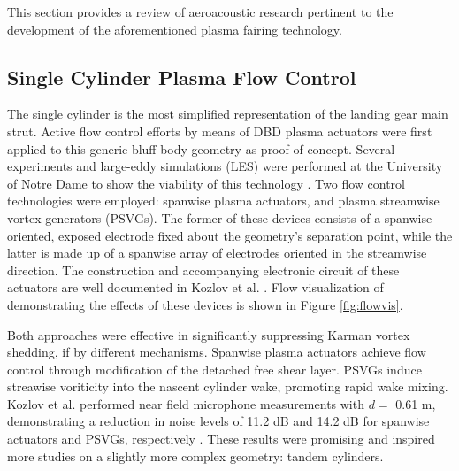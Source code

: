 This section provides a review of aeroacoustic research pertinent to the development of the aforementioned plasma fairing technology.

\subsection{Single Cylinder Plasma Flow Control}

The single cylinder is the most simplified representation of the landing gear main strut. Active flow control efforts by means of DBD plasma actuators were first applied to this generic bluff body geometry as proof-of-concept. Several experiments and large-eddy simulations (LES) were performed at the University of Notre Dame to show the viability of this technology \cite{kim2009} \cite{kozlov2011}. Two flow control technologies were employed: spanwise plasma actuators, and plasma streamwise vortex generators (PSVGs). The former of these devices consists of a spanwise-oriented, exposed electrode fixed about the geometry's separation point, while the latter is made up of a spanwise array of electrodes oriented in the streamwise direction. The construction and accompanying electronic circuit of these actuators are well documented in Kozlov et al. \cite{kozlov2011}. Flow visualization of demonstrating the effects of these devices is shown in Figure \ref{fig:flowvis}. 

Both approaches were effective in significantly suppressing Karman vortex shedding, if by different mechanisms. Spanwise plasma actuators achieve flow control through modification of the detached free shear layer. PSVGs induce streawise voriticity into the nascent cylinder wake, promoting rapid wake mixing. Kozlov et al. performed near field microphone measurements with $d=$ 0.61 m, demonstrating a reduction in noise levels of 11.2 dB and 14.2 dB for spanwise actuators and PSVGs, respectively \cite{kozlov2011}. These results were promising and inspired more studies on a slightly more complex geometry: tandem cylinders.

